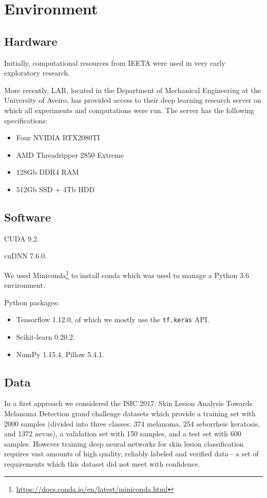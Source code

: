 \chapter{Environment}
\label{chapter:environment}

\section{Hardware}

Initially, computational resources from \ac{IEETA} were used in very early exploratory research.

More recently, \ac{LAR}, located in the Department of Mechanical Engineering at the University of Aveiro, has provided access to their deep learning research server on which all experiments and computations were run. The server has the following specifications:

\begin{itemize}
    \item Four NVIDIA RTX2080TI
    \item AMD Threadripper 2850 Extreme
    \item 128Gb DDR4 RAM
    \item 512Gb SSD + 4Tb HDD
\end{itemize}

\section{Software}

CUDA 9.2.

cuDNN 7.6.0.

We used Miniconda\footnote{\url{https://docs.conda.io/en/latest/miniconda.html}} to install conda which was used to manage a Python 3.6 environment.

Python packages:

\begin{itemize}
    \item Tensorflow 1.12.0, of which we mostly use the \verb|tf.keras| API.
    \item Scikit-learn 0.20.2.
    \item NumPy 1.15.4, Pillow 5.4.1.
\end{itemize}

\section{Data}

In a first approach we considered the ISIC 2017: Skin Lesion Analysis Towards Melanoma Detection grand challenge datasets \cite{isic2017} which provide a training set with 2000 samples (divided into three classes: 374 melanoma, 254 seborrheic keratosis, and 1372 nevus), a validation set with 150 samples, and a test set with 600 samples. However training deep neural networks for skin lesion classification requires vast amounts of high quality, reliably labeled and verified data - a set of requirements which this dataset did not meet with confidence.

